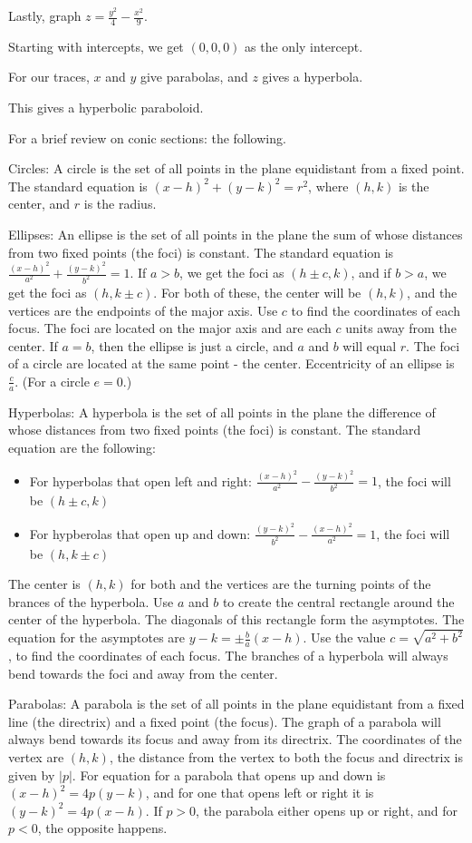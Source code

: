 \documentclass[../calc3.tex]{subfiles}
\begin{document}
\begin{example}
    Lastly, graph $z=\frac{y^2}{4}-\frac{x^2}{9}$.

    Starting with intercepts, we get $(0,0,0)$ as the only intercept.

    For our traces, $x$ and $y$ give parabolas, and $z$ gives a hyperbola.

    This gives a hyperbolic paraboloid.
\end{example}

For a brief review on conic sections: the following.

Circles: A circle is the set of all points in the plane equidistant from a fixed point. The standard equation is $(x-h)^2+(y-k)^2=r^2$, where $(h,k)$ is the center, and $r$ is the radius.

Ellipses: An ellipse is the set of all points in the plane the sum of whose distances from two fixed points (the foci) is constant. The standard equation is $\frac{(x-h)^2}{a^2}+\frac{(y-k)^2}{b^2}=1$. 
If $a>b$, we get the foci as $(h\pm c,k)$, and if $b>a$, we get the foci as $(h,k\pm c)$. For both of these, the center will be $(h,k)$, and the vertices are the endpoints of the major axis. Use $c$ to find the coordinates of each focus. The foci are located on the major axis and are each $c$ units away from the center.
If $a=b$, then the ellipse is just a circle, and $a$ and $b$ will equal $r$. The foci of a circle are located at the same point - the center. Eccentricity of an ellipse is $\frac{c}{a}$. (For a circle $e=0$.)

Hyperbolas: A hyperbola is the set of all points in the plane the difference of whose distances from two fixed points (the foci) is constant. The standard equation are the following:
\begin{itemize}
    \item For hyperbolas that open left and right: $\frac{(x-h)^2}{a^2}-\frac{(y-k)^2}{b^2}=1$, the foci will be $(h\pm c,k)$
    \item For hypberolas that open up and down: $\frac{(y-k)^2}{b^2}-\frac{(x-h)^2}{a^2}=1$, the foci will be $(h,k\pm c)$
\end{itemize}
The center is $(h,k)$ for both and the vertices are the turning points of the brances of the hyperbola. Use $a$ and $b$ to create the central rectangle around the center of the hyperbola. The diagonals of this rectangle form the asymptotes. 
The equation for the asymptotes are $y-k=\pm \frac{b}{a}(x-h)$. Use the value $c=\sqrt{a^2+b^2}$, to find the coordinates of each focus. The branches of a hyperbola will always bend towards the foci and away from the center.

Parabolas: A parabola is the set of all points in the plane equidistant from a fixed line (the directrix) and a fixed point (the focus).
The graph of a parabola will always bend towards its focus and away from its directrix. The coordinates of the vertex are $(h,k)$, the distance from the vertex to both the focus and directrix is given by $|p|$.
For equation for a parabola that opens up and down is $(x-h)^2=4p(y-k)$, and for one that opens left or right it is $(y-k)^2=4p(x-h)$. If $p>0$, the parabola either opens up or right, and for $p<0$, the opposite happens.
\end{document}

